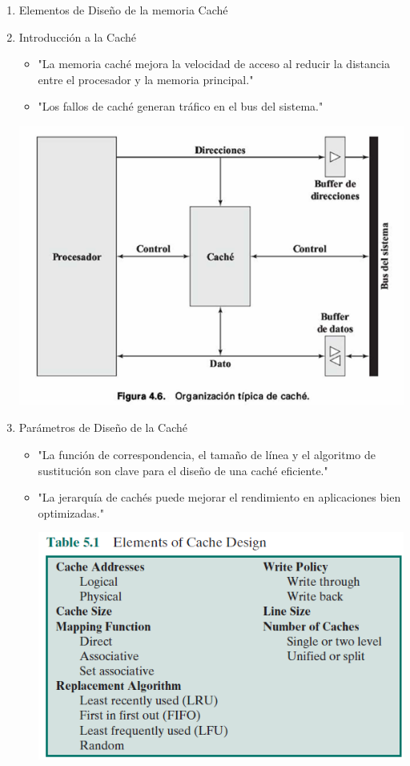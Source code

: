 \documentclass[presentation]{beamer}
\begin{document}
\begin{enumerate}
\item Elementos de Diseño de la memoria Caché
\label{sec:org64e11e4}
\item Introducción a la Caché
\label{sec:org6a5b5a5}
\begin{itemize}
\item "La memoria caché mejora la velocidad de acceso
al reducir la distancia entre el procesador y la memoria principal."
\item "Los fallos de caché generan tráfico en el bus del sistema."
\end{itemize}
\begin{center}
\includegraphics[width=.9\linewidth]{./Imagenes/fig4.6.png}
\end{center}
\item Parámetros de Diseño de la Caché
\label{sec:org6c816c6}
\begin{itemize}
\item "La función de correspondencia, el tamaño de línea y el algoritmo de sustitución
son clave para el diseño de una caché eficiente."
\item "La jerarquía de cachés puede mejorar el rendimiento en aplicaciones bien optimizadas."
\begin{center}
\includegraphics[width=.9\linewidth]{./Imagenes/tabla5.1.png}
\end{center}
\end{itemize}



\end{enumerate}
\end{document}
